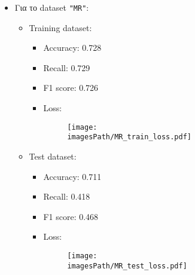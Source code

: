 \documentclass[a4paper, 12pt]{article}
\newcommand{\imagesPath}{results}
\newcommand{\myWidth}{0.8\linewidth}
\begin{document}
            \begin{itemize}
                \item Για το dataset \verb|"MR"|:
                    \begin{itemize}
                        \item Training dataset:
                            \begin{itemize}
                                \item Accuracy: 0.728
                                \item Recall: 0.729
                                \item F1 score: 0.726
                                \item Loss:
                                    \begin{figure}[H]
                                        \centering
                                        \texttt{[image: \\imagesPath/MR\_train\_loss.pdf]}
                                    \end{figure}
                            \end{itemize}
                            
                        \item Test dataset:
                            \begin{itemize}
                                \item Accuracy: 0.711
                                \item Recall: 0.418
                                \item F1 score: 0.468
                                \item Loss:
                                    \begin{figure}[H]
                                        \centering
                                        \texttt{[image: \\imagesPath/MR\_test\_loss.pdf]}
                                    \end{figure}
                            \end{itemize}
                    \end{itemize}
                

\end{itemize}
\end{document}
